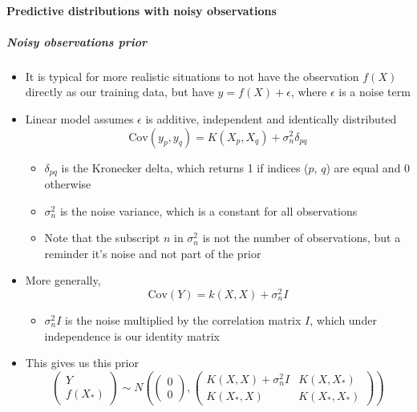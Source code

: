 \documentclass[12pt]{article}
\begin{document}
\paragraph{Predictive distributions with noisy observations}

\subparagraph{Noisy observations prior}
\begin{itemize}
    \item It is typical for more realistic situations to not have the observation $f(X)$ directly as our training data, but have $y = f(X) + \epsilon$, where $\epsilon$ is a noise term
    \item Linear model assumes $\epsilon$ is additive, independent and identically distributed
\begin{equation}
    \text{Cov}(y_p, y_q) = K(X_p, X_q) + \sigma^2_n\delta_{pq}
\end{equation}
    \begin{itemize}
        \item $\delta_{pq}$ is the Kronecker delta, which returns 1 if indices ($p$, $q$) are equal and 0 otherwise
        \item $\sigma^2_n$ is the noise variance, which is a constant for all observations
        \item Note that the subscript $n$ in $\sigma^2_n$ is not the number of observations, but a reminder it's noise and not part of the prior
    \end{itemize}
    \item More generally,
\begin{equation}
    \text{Cov}(Y) = k(X,X) + \sigma^2_nI
\end{equation}
    \begin{itemize}
        \item $\sigma^2_nI$ is the noise multiplied by the correlation matrix $I$, which under independence is our identity matrix
    \end{itemize}
    \item This gives us this prior
\begin{equation}
    \begin{pmatrix}
        Y \\ f(X_*)
    \end{pmatrix} \sim N\left(
    \begin{pmatrix}
        0 \\ 0
    \end{pmatrix},
    \begin{pmatrix}
        K(X,X) + \sigma^2_nI & K(X,X_*) \\ K(X_*,X) & K(X_*,X_*)
    \end{pmatrix}
    \right)
\end{equation}
\end{itemize}
\end{document}
